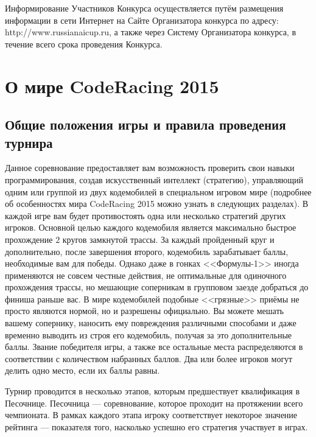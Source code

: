 Информирование Участников Конкурса осуществляется путём размещения информации в сети Интернет на Сайте Организатора конкурса по адресу:
http://www.russianaicup.ru, а также через Систему Организатора конкурса, в течение всего срока проведения Конкурса.

\chapter{О мире CodeRacing 2015}

\section{Общие положения игры и правила проведения турнира}

Данное соревнование предоставляет вам возможность проверить свои навыки программирования, создав искусственный интеллект (стратегию),
управляющий одним или группой из двух кодемобилей в специальном игровом мире (подробнее об особенностях мира CodeRacing 2015 можно узнать в
следующих разделах). В каждой игре вам будет противостоять одна или несколько стратегий других игроков. Основной целью каждого кодемобиля
является максимально быстрое прохождение $2$ кругов замкнутой трассы. За каждый пройденный круг и дополнительно, после завершения
второго, кодемобиль зарабатывает баллы, необходимые вам для победы. Однако даже в гонках <<Формулы-1>> иногда применяются не совсем
честные действия, не оптимальные для одиночного прохождения трассы, но мешающие соперникам в групповом заезде добраться до финиша раньше
вас. В мире кодемобилей подобные <<грязные>> приёмы не просто являются нормой, но и разрешены официально. Вы можете мешать вашему сопернику,
наносить ему повреждения различными способами и даже временно выводить из строя его кодемобиль, получая за это дополнительные баллы. Звание
победителя игры, а также все остальные места распределяются в соответствии с количеством набранных баллов. Два или более игроков могут
делить одно место, если их баллы равны.

Турнир проводится в несколько этапов, которым предшествует квалификация в Песочнице. Песочница --- соревнование, которое проходит на
протяжении всего чемпионата. В рамках каждого этапа игроку соответствует некоторое значение рейтинга --- показателя того, насколько успешно
его стратегия участвует в играх.

